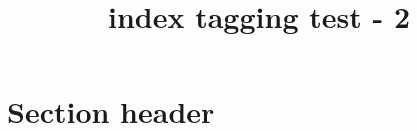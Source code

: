 \documentclass{article}
\title{index tagging test - 2}
\begin{document}
\tableofcontents

\section{Section header}

\printindex
\end{document}
